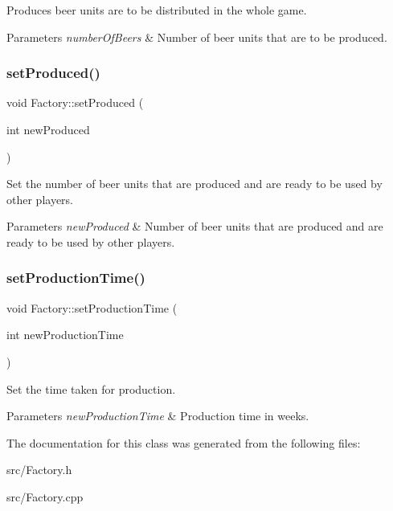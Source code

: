 Produces beer units are to be distributed in the whole game. 
\begin{DoxyParams}{Parameters}
{\em number\+Of\+Beers} & Number of beer units that are to be produced. \\
\hline
\end{DoxyParams}
\mbox{\label{classFactory_a26b79db3c39fb85c25c939ad8e5cc074}} 
\subsubsection{\texorpdfstring{set\+Produced()}{setProduced()}}
{\footnotesize\ttfamily void Factory\+::set\+Produced (\begin{DoxyParamCaption}\item[{int}]{new\+Produced }\end{DoxyParamCaption})}

Set the number of beer units that are produced and are ready to be used by other players. 
\begin{DoxyParams}{Parameters}
{\em new\+Produced} & Number of beer units that are produced and are ready to be used by other players. \\
\hline
\end{DoxyParams}
\mbox{\label{classFactory_ac8a766aa4abfeadf7bffb2a4d4baacd2}} 
\subsubsection{\texorpdfstring{set\+Production\+Time()}{setProductionTime()}}
{\footnotesize\ttfamily void Factory\+::set\+Production\+Time (\begin{DoxyParamCaption}\item[{int}]{new\+Production\+Time }\end{DoxyParamCaption})}

Set the time taken for production. 
\begin{DoxyParams}{Parameters}
{\em new\+Production\+Time} & Production time in weeks. \\
\hline
\end{DoxyParams}


The documentation for this class was generated from the following files\+:\begin{DoxyCompactItemize}
\item 
src/Factory.\+h\item 
src/Factory.\+cpp\end{DoxyCompactItemize}
